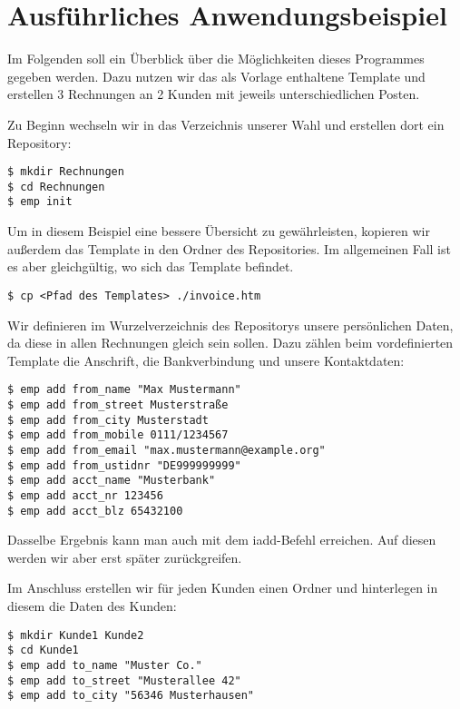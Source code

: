 

\section{Ausführliches Anwendungsbeispiel}
Im Folgenden soll ein Überblick über die Möglichkeiten dieses Programmes gegeben werden. Dazu nutzen wir das als Vorlage enthaltene Template und erstellen 3 Rechnungen an 2 Kunden mit jeweils unterschiedlichen Posten.

Zu Beginn wechseln wir in das Verzeichnis unserer Wahl und erstellen dort ein Repository:
\begin{lstlisting}[style=Bash]
$ mkdir Rechnungen
$ cd Rechnungen
$ emp init
\end{lstlisting}

Um in diesem Beispiel eine bessere Übersicht zu gewährleisten, kopieren wir außerdem das Template in den Ordner des Repositories. Im allgemeinen Fall ist es aber gleichgültig, wo sich das Template befindet.
\begin{lstlisting}[style=Bash]
$ cp <Pfad des Templates> ./invoice.htm
\end{lstlisting}


Wir definieren im Wurzelverzeichnis des Repositorys unsere persönlichen Daten, da diese in allen Rechnungen gleich sein sollen. Dazu zählen beim vordefinierten Template die Anschrift, die Bankverbindung und unsere Kontaktdaten:

\begin{lstlisting}[style=Bash]
$ emp add from_name "Max Mustermann"
$ emp add from_street Musterstraße
$ emp add from_city Musterstadt
$ emp add from_mobile 0111/1234567
$ emp add from_email "max.mustermann@example.org"
$ emp add from_ustidnr "DE999999999"
$ emp add acct_name "Musterbank"
$ emp add acct_nr 123456
$ emp add acct_blz 65432100
\end{lstlisting}

Dasselbe Ergebnis kann man auch mit dem iadd-Befehl erreichen. Auf diesen werden wir aber erst später zurückgreifen.


Im Anschluss erstellen wir für jeden Kunden einen Ordner und hinterlegen in diesem die Daten des Kunden:
\begin{lstlisting}[style=Bash]
$ mkdir Kunde1 Kunde2
$ cd Kunde1
$ emp add to_name "Muster Co."
$ emp add to_street "Musterallee 42"
$ emp add to_city "56346 Musterhausen"
\end{lstlisting}

